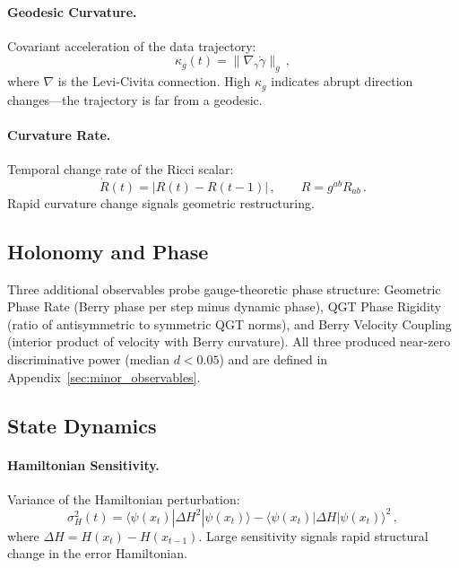 \documentclass[3p]{elsarticle}
\newcommand{\dbraket}[3]{\langle#1|#2|#3\rangle}
\begin{document}
\paragraph{Geodesic Curvature.}
Covariant acceleration of the data trajectory:
\begin{equation}\label{eq:geodesic_curv}
  \kappa_g(t) = \|\nabla_{\dot\gamma}\dot\gamma\|_g\,,
\end{equation}
where $\nabla$ is the Levi-Civita connection.  High $\kappa_g$
indicates abrupt direction changes---the trajectory is far from a
geodesic.

\paragraph{Curvature Rate.}
Temporal change rate of the Ricci scalar:
\begin{equation}\label{eq:curv_rate}
  \dot{R}(t) = |R(t) - R(t-1)|\,,\qquad R = g^{ab}R_{ab}\,.
\end{equation}
Rapid curvature change signals geometric restructuring.

\subsection{Holonomy and Phase}%
\label{subsec:geom_phase_rate}\label{subsec:qgt_rigidity}%
\label{subsec:berry_vel_coupling}

Three additional observables probe gauge-theoretic phase structure:
Geometric Phase Rate (Berry phase per step minus dynamic phase),
QGT Phase Rigidity (ratio of antisymmetric to symmetric QGT norms),
and Berry Velocity Coupling (interior product of velocity with Berry
curvature).  All three produced near-zero discriminative power
(median $d < 0.05$) and are defined in
Appendix~\ref{sec:minor_observables}.

\subsection{State Dynamics}%
\label{subsec:ham_sensitivity}\label{subsec:reduced_purity}\label{subsec:qre}

\paragraph{Hamiltonian Sensitivity.}
Variance of the Hamiltonian perturbation:
\begin{equation}\label{eq:ham_sensitivity}
  \sigma^2_H(t) = \dbraket{\psi(x_t)}{\Delta H^2}{\psi(x_t)}
    - \dbraket{\psi(x_t)}{\Delta H}{\psi(x_t)}^2\,,
\end{equation}
where $\Delta H = H(x_t) - H(x_{t-1})$.  Large sensitivity signals
rapid structural change in the error Hamiltonian.
\end{document}
